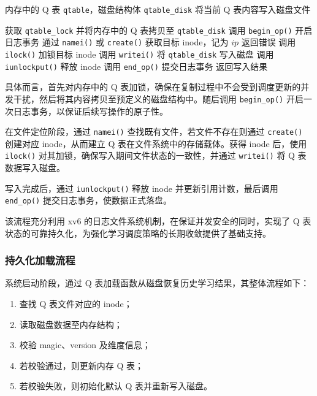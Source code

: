 \begin{algorithm}[H]
\caption{Q表持久化写入流程}
\label{alg:qsave}
\begin{algorithmic}[1]
\Require 内存中的 Q 表 \texttt{qtable}，磁盘结构体 \texttt{qtable\_disk}
\Ensure 将当前 Q 表内容写入磁盘文件

\State 获取 \texttt{qtable\_lock} 并将内存中的 Q 表拷贝至 \texttt{qtable\_disk}
\State 调用 \texttt{begin\_op()} 开启日志事务
\State 通过 \texttt{namei()} 或 \texttt{create()} 获取目标 inode，记为 $ip$
    \State 返回错误
\EndIf
\State 调用 \texttt{ilock()} 加锁目标 inode
\State 调用 \texttt{writei()} 将 \texttt{qtable\_disk} 写入磁盘
\State 调用 \texttt{iunlockput()} 释放 inode
\State 调用 \texttt{end\_op()} 提交日志事务
\State 返回写入结果
\end{algorithmic}
\end{algorithm}

具体而言，首先对内存中的 Q 表加锁，确保在复制过程中不会受到调度更新的并发干扰，然后将其内容拷贝至预定义的磁盘结构中。随后调用 \texttt{begin\_op()} 开启一次日志事务，以保证后续写操作的原子性。

在文件定位阶段，通过 \texttt{namei()} 查找既有文件，若文件不存在则通过 \texttt{create()} 创建对应 inode，从而建立 Q 表在文件系统中的存储载体。获得 inode 后，使用 \texttt{ilock()} 对其加锁，确保写入期间文件状态的一致性，并通过 \texttt{writei()} 将 Q 表数据写入磁盘。

写入完成后，通过 \texttt{iunlockput()} 释放 inode 并更新引用计数，最后调用 \texttt{end\_op()} 提交日志事务，使数据正式落盘。

该流程充分利用 xv6 的日志文件系统机制，在保证并发安全的同时，实现了 Q 表状态的可靠持久化，为强化学习调度策略的长期收敛提供了基础支持。

\subsubsection{持久化加载流程}

系统启动阶段，通过 Q 表加载函数从磁盘恢复历史学习结果，其整体流程如下：

\begin{enumerate}
\item 查找 Q 表文件对应的 inode；
\item 读取磁盘数据至内存结构；
\item 校验 magic、version 及维度信息；
\item 若校验通过，则更新内存 Q 表；
\item 若校验失败，则初始化默认 Q 表并重新写入磁盘。
\end{enumerate}

